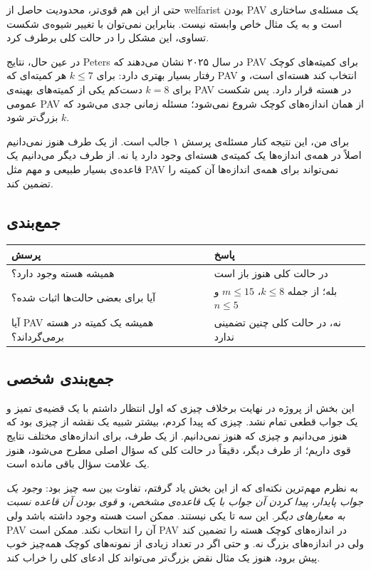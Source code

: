 \documentclass[12pt, a4paper]{article}
\begin{document}
حتی از این هم قوی‌تر، محدودیت حاصل از welfarist بودن PAV یک مسئله‌ی ساختاری است و به یک مثال خاص وابسته نیست. بنابراین نمی‌توان با تغییر شیوه‌ی شکست تساوی، این مشکل را در حالت کلی برطرف کرد. \cite{peters2020welfarism}

در عین حال، نتایج Peters در سال ۲۰۲۵ نشان می‌دهند که PAV برای کمیته‌های کوچک رفتار بسیار بهتری دارد: برای $k\le7$ هر کمیته‌ای که PAV انتخاب کند هسته‌ای است، و برای $k=8$ دست‌کم یکی از کمیته‌های بهینه‌ی PAV در هسته قرار دارد. پس شکست عمومی PAV از همان اندازه‌های کوچک شروع نمی‌شود؛ مسئله زمانی جدی می‌شود که $k$ بزرگ‌تر شود. \cite{peters2025core}

برای من، این نتیجه کنار مسئله‌ی پرسش ۱ جالب است. از یک طرف هنوز نمی‌دانیم اصلاً در همه‌ی اندازه‌ها یک کمیته‌ی هسته‌ای وجود دارد یا نه. از طرف دیگر می‌دانیم یک قاعده‌ی بسیار طبیعی و مهم مثل PAV نمی‌تواند برای همه‌ی اندازه‌ها آن کمیته را تضمین کند.

\subsection{جمع‌بندی}

\begin{center}
\begin{tabular}{l|l}
پرسش & پاسخ \\
\hline
همیشه هسته وجود دارد؟ & در حالت کلی هنوز باز است \\
آیا برای بعضی حالت‌ها اثبات شده؟ & بله؛ از جمله $k\le8$، $m\le15$ و $n\le5$ \\
آیا PAV همیشه یک کمیته در هسته برمی‌گرداند؟ & نه، در حالت کلی چنین تضمینی ندارد
\end{tabular}
\end{center}

\subsection*{جمع‌بندی شخصی}

این بخش از پروژه در نهایت برخلاف چیزی که اول انتظار داشتم با یک قضیه‌ی تمیز و یک جواب قطعی تمام نشد. چیزی که پیدا کردم، بیشتر شبیه یک نقشه از چیزی بود که هنوز می‌دانیم و چیزی که هنوز نمی‌دانیم. از یک طرف، برای اندازه‌های مختلف نتایج قوی داریم؛ از طرف دیگر، دقیقاً در حالت کلی که سؤال اصلی مطرح می‌شود، هنوز یک علامت سؤال باقی مانده است.

به نظرم مهم‌ترین نکته‌ای که از این بخش یاد گرفتم، تفاوت بین سه چیز بود: \emph{وجود یک جواب پایدار}، \emph{پیدا کردن آن جواب با یک قاعده‌ی مشخص}، و \emph{قوی بودن آن قاعده نسبت به معیارهای دیگر}. این سه تا یکی نیستند. ممکن است هسته وجود داشته باشد ولی PAV آن را انتخاب نکند. ممکن است PAV در اندازه‌های کوچک هسته را تضمین کند ولی در اندازه‌های بزرگ نه. و حتی اگر در تعداد زیادی از نمونه‌های کوچک همه‌چیز خوب پیش برود، هنوز یک مثال نقض بزرگ‌تر می‌تواند کل ادعای کلی را خراب کند.
\end{document}

